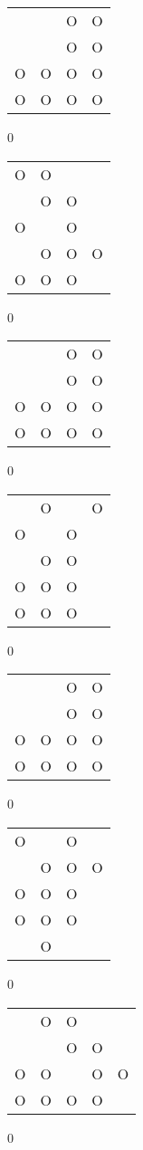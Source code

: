 \begin{tabular}{|m{0.2cm}m{0.2cm}m{0.2cm}m{0.2cm}|}\hline
 & &O&O\\
 & &O&O\\
O&O&O&O\\
O&O&O&O\\
\hline\end{tabular}0
\begin{tabular}{|m{0.2cm}m{0.2cm}m{0.2cm}m{0.2cm}|}\hline
O&O& & \\
 &O&O& \\
O& &O& \\
 &O&O&O\\
O&O&O& \\
\hline\end{tabular}0
\begin{tabular}{|m{0.2cm}m{0.2cm}m{0.2cm}m{0.2cm}|}\hline
 & &O&O\\
 & &O&O\\
O&O&O&O\\
O&O&O&O\\
\hline\end{tabular}0
\begin{tabular}{|m{0.2cm}m{0.2cm}m{0.2cm}m{0.2cm}|}\hline
 &O& &O\\
O& &O& \\
 &O&O& \\
O&O&O& \\
O&O&O& \\
\hline\end{tabular}0
\begin{tabular}{|m{0.2cm}m{0.2cm}m{0.2cm}m{0.2cm}|}\hline
 & &O&O\\
 & &O&O\\
O&O&O&O\\
O&O&O&O\\
\hline\end{tabular}0
\begin{tabular}{|m{0.2cm}m{0.2cm}m{0.2cm}m{0.2cm}|}\hline
O& &O& \\
 &O&O&O\\
O&O&O& \\
O&O&O& \\
 &O& & \\
\hline\end{tabular}0
\begin{tabular}{|m{0.2cm}m{0.2cm}m{0.2cm}m{0.2cm}m{0.2cm}|}\hline
 &O&O& & \\
 & &O&O& \\
O&O& &O&O\\
O&O&O&O& \\
\hline\end{tabular}0
